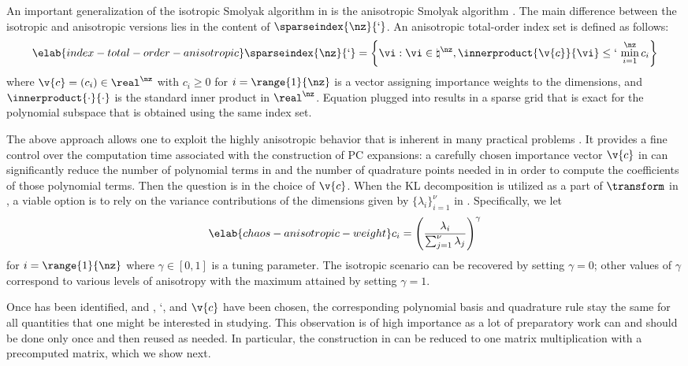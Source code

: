 An important generalization of the isotropic Smolyak algorithm in
 is the anisotropic Smolyak algorithm \cite{nobile2008}.
The main difference between the isotropic and anisotropic versions lies in the
content of $\sparseindex{\nz}{\lq}$. An anisotropic total-order index set is
defined as follows:
\begin{equation} \elab{index-total-order-anisotropic}
  \sparseindex{\nz}{\lq} = \left\{ \vi: \vi \in \natural^\nz, \innerproduct{\v{c}}{\vi} \leq \lq \, \min_{i = 1}^\nz c_i \right\}
\end{equation}
where $\v{c} = (c_i) \in \real^\nz$ with $c_i \geq 0$ for $i = \range{1}{\nz}$
is a vector assigning importance weights to the dimensions, and
$\innerproduct{\cdot}{\cdot}$ is the standard inner product in $\real^\nz$.
Equation  plugged into
 results in a sparse grid that is exact for the
polynomial subspace that is obtained using the same index set.

The above approach allows one to exploit the highly anisotropic behavior that is
inherent in many practical problems \cite{nobile2008}. It provides a fine
control over the computation time associated with the construction of \ac{PC}
expansions: a carefully chosen importance vector $\v{c}$ in
 can significantly reduce the number of
polynomial terms in  and the number of quadrature points
needed in  in order to compute the coefficients of those
polynomial terms. Then the question is in the choice of $\v{c}$. When the
\ac{KL} decomposition is utilized as a part of $\transform$ in
, a viable option is to rely on the variance
contributions of the dimensions given by $\{ \lambda_i \}_{i = 1}^\nu$ in
. Specifically, we let
\begin{equation} \elab{chaos-anisotropic-weight}
  c_i = \left(\frac{\lambda_i}{\sum_{j = 1}^\nu \lambda_j}\right)^\gamma
\end{equation}
for $i = \range{1}{\nz}$ where $\gamma \in [0, 1]$ is a tuning parameter. The
isotropic scenario can be recovered by setting $\gamma = 0$; other values of
$\gamma$ correspond to various levels of anisotropy with the maximum attained by
setting $\gamma = 1$.

Once \vz has been identified, and \lc, \lq, and $\v{c}$ have been chosen, the
corresponding polynomial basis and quadrature rule stay the same for all
quantities that one might be interested in studying. This observation is of high
importance as a lot of preparatory work can and should be done only once and
then reused as needed. In particular, the construction in 
can be reduced to one matrix multiplication with a precomputed matrix, which we
show next.

